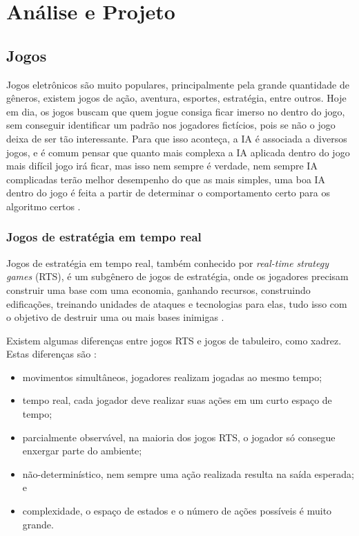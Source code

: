 \chapter{\label{chap:ativ}Análise e Projeto}

\section{Jogos}
 Jogos eletrônicos são muito populares, principalmente pela grande quantidade de gêneros, existem jogos de ação, aventura, esportes, estratégia, entre outros. Hoje em dia, os jogos buscam que quem jogue consiga ficar imerso no dentro do jogo, sem conseguir identificar um padrão nos jogadores fictícios, pois se não o jogo deixa de ser tão interessante. Para que isso aconteça, a IA é associada a diversos jogos, e é comum pensar que quanto mais complexa a IA aplicada dentro do jogo mais difícil jogo irá ficar, mas isso nem sempre é verdade, nem sempre IA complicadas terão melhor desempenho do que as mais simples, uma boa IA dentro do jogo é feita a partir de determinar o comportamento certo para os algoritmo certos \cite{millington2009artificial}.
 
 \subsection{Jogos de estratégia em tempo real}
 
 Jogos de estratégia em tempo real, também conhecido por \textit{real-time strategy games} (RTS), é um subgênero de jogos de estratégia, onde os jogadores precisam construir uma base com uma economia, ganhando recursos, construindo edificações, treinando unidades de ataques e tecnologias para elas, tudo isso com o objetivo de destruir uma ou mais bases inimigas \cite{ontanon2013survey, buro2012real}. 
 
 Existem algumas diferenças entre jogos RTS e jogos de tabuleiro, como xadrez. Estas diferenças são \cite{ontanon2013survey}:
 
 \begin{itemize}
 	\item movimentos simultâneos, jogadores realizam jogadas ao mesmo tempo;
 	\item tempo real, cada jogador deve realizar suas ações em um curto espaço de tempo;
 	\item parcialmente observável, na maioria dos jogos RTS, o jogador só consegue enxergar parte do ambiente;
 	\item não-determinístico, nem sempre uma ação realizada resulta na saída esperada; e
 	\item complexidade, o espaço de estados e o número de ações possíveis é muito grande.
 \end{itemize} 
 
